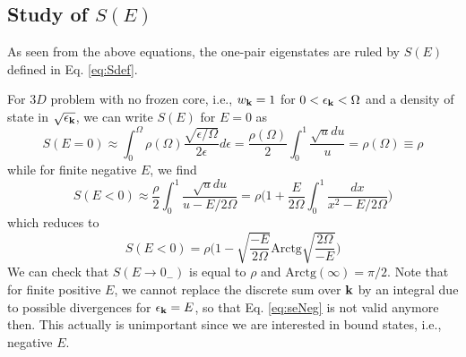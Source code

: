 \documentclass[11pt]{article} %
\begin{document}
\subsection{Study of $S(E)$}
As seen from the above equations, the one-pair eigenstates are ruled by $S(E)$ defined in Eq. \ref{eq:Sdef}. 

For $3D$ problem with no frozen core, i.e., $w_{\mathbf{k}}=1$ for $0<\epsilon_{\mathbf{k}}<\Omega$ and a density of state in $\sqrt{\epsilon_{\mathbf{k}}}$, we can write $S(E)$ for $E=0$ as 
\begin{equation}
S(E=0)\approx\int_0^{\Omega}\rho(\Omega)\frac{\sqrt{\epsilon/\Omega}}{2\epsilon}d\epsilon
=\frac{\rho(\Omega)}{2}\int_0^1\frac{\sqrt{u}du}{u}=\rho(\Omega)\equiv\rho
\end{equation}
while for finite negative $E$, we find
\begin{equation}
S(E<0)\approx\frac{\rho}{2}\int_0^1\frac{\sqrt{u}du}{u-E/2\Omega}
=\rho\Big(1+\frac{E}{2\Omega}\int_0^1\frac{dx}{x^2-E/2\Omega}\Big)
\end{equation}
which reduces to 
\begin{equation}\label{eq:seNeg}
S(E<0)=\rho\Big(1-\sqrt{\frac{-E}{2\Omega}}\text{Arctg}\sqrt{\frac{2\Omega}{-E}}\Big)
\end{equation}
We can check that $S(E\to0_{-})$ is equal to $\rho$ and $\text{Arctg}(\infty)=\pi/2$.  Note that for finite positive $E$, we cannot replace the discrete sum over $\mathbf{k}$ by an integral due to possible divergences for $\epsilon_{\mathbf{k}}=E$, so that Eq. \ref{eq:seNeg} is not valid anymore then. This actually is unimportant since we are interested in bound states, i.e., negative $E$.
\end{document}
